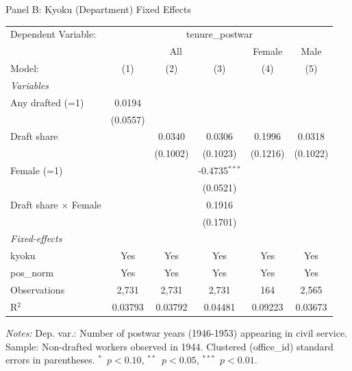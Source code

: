 \begin{table}[htbp]
\begin{threeparttable}
\par\endgroup
\vspace{2ex}
Panel B: Kyoku (Department) Fixed Effects\\[1ex]
\begingroup
\centering
\begin{tabular}{lccccc}
   \tabularnewline \midrule \midrule
   Dependent Variable: & \multicolumn{5}{c}{tenure\_postwar}\\
    & \multicolumn{3}{c}{All} & Female & Male \\ 
   Model:                       & (1)      & (2)      & (3)             & (4)      & (5)\\  
   \midrule
   \emph{Variables}\\
   Any drafted (=1)             & 0.0194   &          &                 &          &   \\   
                                & (0.0557) &          &                 &          &   \\   
   Draft share                  &          & 0.0340   & 0.0306          & 0.1996   & 0.0318\\   
                                &          & (0.1002) & (0.1023)        & (0.1216) & (0.1022)\\   
   Female (=1)                  &          &          & -0.4735$^{***}$ &          &   \\   
                                &          &          & (0.0521)        &          &   \\   
   Draft share $\times$ Female  &          &          & 0.1916          &          &   \\   
                                &          &          & (0.1701)        &          &   \\   
   \midrule
   \emph{Fixed-effects}\\
   kyoku                        & Yes      & Yes      & Yes             & Yes      & Yes\\  
   pos\_norm                    & Yes      & Yes      & Yes             & Yes      & Yes\\  
   \midrule
   Observations                 & 2,731    & 2,731    & 2,731           & 164      & 2,565\\  
   R$^2$                        & 0.03793  & 0.03792  & 0.04481         & 0.09223  & 0.03673\\  
   \midrule \midrule
\end{tabular}
\par\endgroup
\begin{tablenotes}[flushleft]
\footnotesize
\item \textit{Notes:} Dep. var.: Number of postwar years (1946-1953) appearing in civil service. Sample: Non-drafted workers observed in 1944. Clustered (office\_id) standard errors in parentheses. $^{*}$~$p<0.10$, $^{**}$~$p<0.05$, $^{***}$~$p<0.01$.
\end{tablenotes}
\end{threeparttable}
\end{table}
